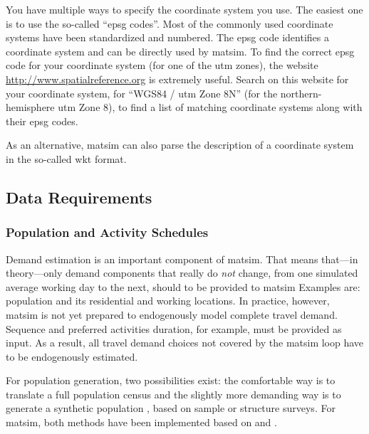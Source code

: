 You have multiple ways to specify the coordinate system you use. The easiest one is to use the so-called ``\gls{epsg} codes''. Most of the commonly used coordinate systems have been standardized and numbered. The \gls{epsg} code identifies a coordinate system and can be directly used by \gls{matsim}. To find the correct \gls{epsg} code for your coordinate system (\eg for one of the \gls{utm} zones), the website \url{http://www.spatialreference.org} is extremely useful. Search on this website for your coordinate system, \eg for ``WGS84 / \gls{utm} Zone 8N'' (for the northern-hemisphere \gls{utm} Zone 8), to find a list of matching coordinate systems along with their \gls{epsg} codes.

As an alternative, \gls{matsim} can also parse the description of a coordinate system in the so-called \gls{wkt} format. 

\subsection{Data Requirements}
\subsubsection{Population and Activity Schedules}
Demand estimation is 
an important component of \gls{matsim}. That means that---in theory---only demand components that  really do \emph{not} change, from one simulated average working day to the next, should to be provided to \gls{matsim} 
Examples are: population and its residential and working locations. In practice, however, \gls{matsim} is not yet prepared to endogenously model complete travel demand. Sequence and preferred activities duration, for example, must be provided as input. As a result, all travel demand choices not covered by the \gls{matsim} loop have to be endogenously estimated. 

For population generation, two possibilities exist: the comfortable way is to translate a full population census and the slightly more demanding way is to generate a synthetic population \citep[e.g.,][]{GuoBhat_TRR_2007}, based on sample or structure surveys. For \gls{matsim}, both methods have been implemented based on \citet[][]{BfS_VZ_2000} and \citet[][]{Mueller_unpub_STRC_2011}.

